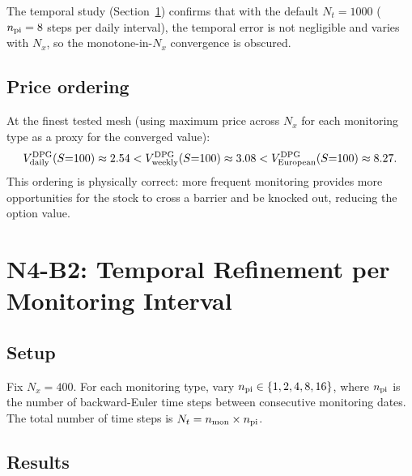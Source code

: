 \documentclass[11pt,a4paper]{article}
\newcommand{\Nx}{N_x}
\newcommand{\Nt}{N_t}
\newcommand{\npi}{n_{\rm pi}}
\begin{document}
The temporal study (Section~\ref{sec:temporal}) confirms that with the
default $\Nt = 1000$ ($\npi = 8$ steps per daily interval), the
temporal error is not negligible and varies with $\Nx$, so the
monotone-in-$\Nx$ convergence is obscured.

\subsection{Price ordering}

At the finest tested mesh (using maximum price across $\Nx$ for each
monitoring type as a proxy for the converged value):
\[
  V_{\rm daily}^{\rm DPG}(S{=}100) \approx 2.54
  < V_{\rm weekly}^{\rm DPG}(S{=}100) \approx 3.08
  < V_{\rm European}^{\rm DPG}(S{=}100) \approx 8.27.
\]
This ordering is physically correct: more frequent monitoring provides
more opportunities for the stock to cross a barrier and be knocked out,
reducing the option value.

\section{N4-B2: Temporal Refinement per Monitoring Interval}
\label{sec:temporal}

\subsection{Setup}

Fix $\Nx = 400$.  For each monitoring type, vary $\npi \in \{1,2,4,8,16\}$,
where $\npi$ is the number of backward-Euler time steps between
consecutive monitoring dates.  The total number of time steps is
$\Nt = n_{\rm mon} \times \npi$.

\subsection{Results}
\end{document}
